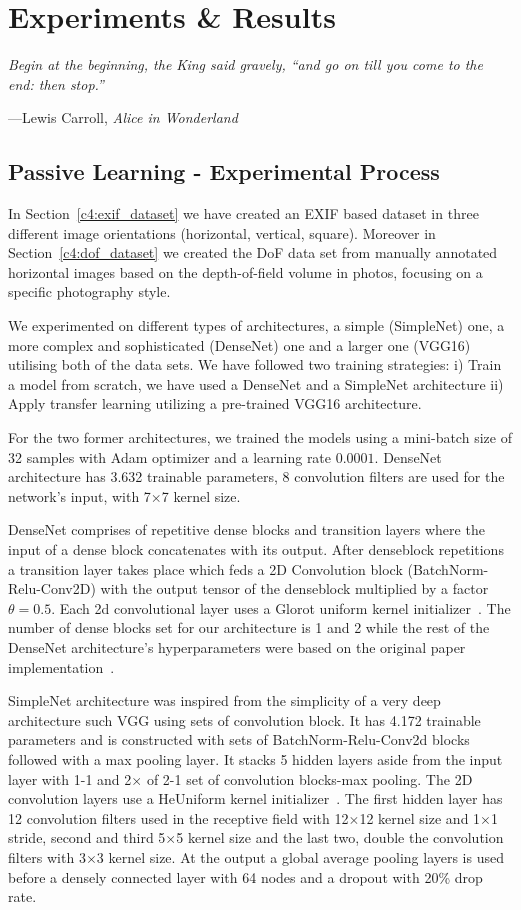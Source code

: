 \chapter{Experiments \& Results} \label{c5:intro}
\thispagestyle{empty}
\epigraph{\itshape Begin at the beginning, the King said gravely, ``and go on till you come to the end: then stop.''}
{---Lewis Carroll, \textit{Alice in Wonderland}}
\section{Passive Learning - Experimental Process}
\label{c5:section_passive_learning}

In Section~\ref{c4:exif_dataset} we have created an EXIF based dataset in three different image orientations (horizontal, vertical, square). Moreover in Section~\ref{c4:dof_dataset} we created the DoF data set from manually annotated horizontal images based on the depth-of-field volume in photos, focusing on a specific photography style.

We experimented on different types of architectures, a simple (SimpleNet) one, a more complex and sophisticated (DenseNet) one and a larger one (VGG16) utilising both of the data sets.
We have followed two training strategies: i) Train a model from scratch, we have used a DenseNet and a SimpleNet architecture ii) Apply transfer learning utilizing a pre-trained VGG16 architecture.

For the two former architectures, we trained the models using a mini-batch size of 32 samples with Adam optimizer and a learning rate $0.0001$.
DenseNet architecture has 3.632 trainable parameters, 8 convolution filters are used for the network's input, with 7$\times$7 kernel size.

DenseNet comprises of repetitive dense blocks and transition layers where the input of a dense block concatenates with its output. After denseblock repetitions a transition layer takes place which feds a 2D Convolution block (BatchNorm-Relu-Conv2D) with the output tensor of the denseblock multiplied by a factor $\theta=0.5$.
Each 2d convolutional layer uses a Glorot uniform kernel initializer~\cite{glorot2010understanding}.
The number of dense blocks set for our architecture is 1 and 2 while the rest of the DenseNet architecture's hyperparameters were based on the original paper implementation~\cite{huang2017densely}.

SimpleNet architecture was inspired from the simplicity of a very deep architecture such VGG using sets of convolution block. It has 4.172 trainable parameters and is constructed with sets of BatchNorm-Relu-Conv2d blocks followed with a max pooling layer. It stacks 5 hidden layers aside from the input layer with 1-1 and 2$\times$ of 2-1 set of convolution blocks-max pooling. The 2D convolution layers use a HeUniform kernel initializer~\cite{he2015delving}.
The first hidden layer has 12 convolution filters used in the receptive field with 12$\times$12 kernel size and 1$\times$1 stride, second and third 5$\times$5 kernel size and the last two, double the convolution filters with 3$\times$3 kernel size.
At the output a global average pooling layers is used before a densely connected layer with 64 nodes and a dropout with 20\% drop rate.

